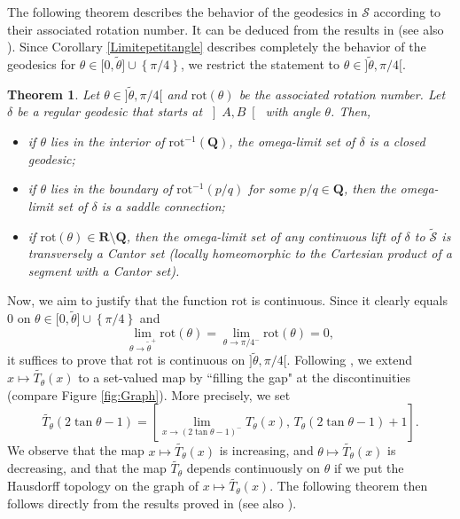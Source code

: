 \documentclass[11pt]{article}
\newtheorem{thm}{Theorem}[section]
\begin{document}
The following theorem describes the behavior of the geodesics in $\mathcal{S}$ according to their associated rotation number. It can be deduced from the results in \cite{RhodesThompson1} (see also \cite{Brette}). Since Corollary \ref{Limitepetitangle} describes completely the behavior of the geodesics for $\theta\in\bigl[0,\widetilde{\theta}\bigr]\cup\left\{\pi/4\right\}$, we restrict the statement to $\theta\in\bigl]\widetilde{\theta},\pi/4\bigr[$.

\begin{thm}
\label{limitedeuxinterv}
    Let $\theta\in\bigl]\widetilde{\theta},\pi/4\bigr[$ and $\text{rot}(\theta)$ be the associated rotation number. Let $\delta$ be a regular geodesic that starts at $\left]A,B\right[$ with angle $\theta$. Then,
    \begin{itemize}
        \item if $\theta$ lies in the interior of $\text{rot}^{-1}\left(\mathbf{Q}\right)$, the omega-limit set of $\delta$ is a closed geodesic;
        \item if $\theta$ lies in the boundary of $\text{rot}^{-1}\left(p/q\right)$ for some $p/q\in\mathbf{Q}$, then the omega-limit set of $\delta$ is a saddle connection;
        \item if $\text{rot}(\theta)\in\mathbf{R}\setminus\mathbf{Q}$, then the omega-limit set of any continuous lift of  $\delta$ to $\widetilde{\mathcal{S}}$ is transversely a Cantor set (locally homeomorphic to the Cartesian product of a segment with a Cantor set).
    \end{itemize}
\end{thm}

Now, we aim to justify that the function $\text{rot}$ is continuous. Since it clearly equals 0 on $\theta\in\bigl[0,\widetilde{\theta}\bigr]\cup\left\{\pi/4\right\}$ and $$\lim_{\theta\rightarrow\widetilde{\theta}^{+}}\text{rot}(\theta)=\lim_{\theta\rightarrow\pi/4^{-}}\text{rot}(\theta)=0,$$ it suffices to prove that $\text{rot}$ is continuous on $\bigl]\widetilde{\theta},\pi/4\bigr[$. Following \cite{RhodesThompson2}, we extend $x\mapsto \widetilde{T_{\theta}}\left(x\right)$ to a set-valued map by ``filling the gap" at the discontinuities (compare Figure \ref{fig:Graph}). More precisely, we set
\[
\widetilde{T_{\theta}}\left(2\tan\theta-1\right)=\left[\lim_{x\rightarrow\left(2\tan\theta-1\right)^{-}}T_{\theta}\left(x\right),\,T_{\theta}\left(2\tan\theta-1\right)+1\right].
\]
We observe that the map $x\mapsto \widetilde{T_{\theta}}\left(x\right)$ is increasing, and $\theta\mapsto \widetilde{T_{\theta}}\left(x\right)$ is decreasing, and that the map $\widetilde{T_{\theta}}$ depends continuously on $\theta$ if we put the Hausdorff topology on the graph of $x\mapsto \widetilde{T_{\theta}}\left(x\right)$. The following theorem then follows directly from the results proved in \cite{RhodesThompson2} (see also \cite{Brette}).
\end{document}
